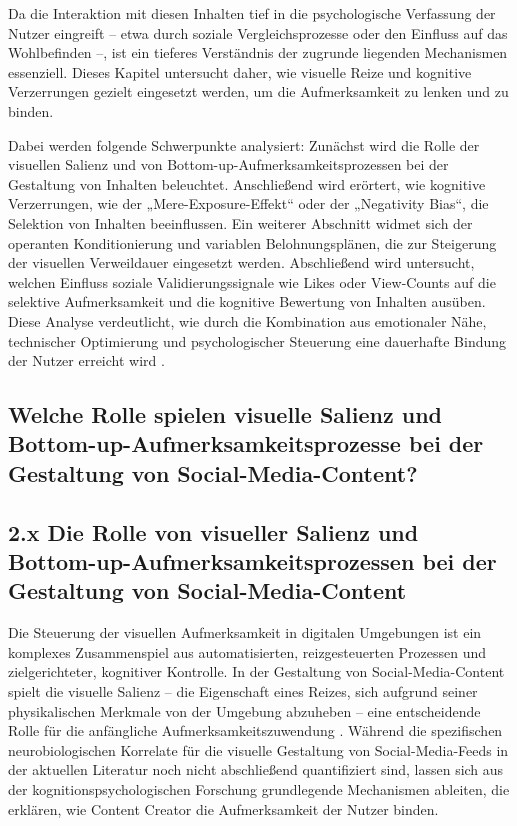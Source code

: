 \documentclass[11pt,a4paper]{article}
\begin{document}
Da die Interaktion mit diesen Inhalten tief in die psychologische Verfassung der Nutzer eingreift – etwa durch soziale Vergleichsprozesse oder den Einfluss auf das Wohlbefinden \autocite{openalex_W2924664363,doaj_10febcbb5e60420699a1d4570a075832} –, ist ein tieferes Verständnis der zugrunde liegenden Mechanismen essenziell. Dieses Kapitel untersucht daher, wie visuelle Reize und kognitive Verzerrungen gezielt eingesetzt werden, um die Aufmerksamkeit zu lenken und zu binden.

Dabei werden folgende Schwerpunkte analysiert: Zunächst wird die Rolle der visuellen Salienz und von Bottom-up-Aufmerksamkeitsprozessen bei der Gestaltung von Inhalten beleuchtet. Anschließend wird erörtert, wie kognitive Verzerrungen, wie der „Mere-Exposure-Effekt“ oder der „Negativity Bias“, die Selektion von Inhalten beeinflussen. Ein weiterer Abschnitt widmet sich der operanten Konditionierung und variablen Belohnungsplänen, die zur Steigerung der visuellen Verweildauer eingesetzt werden. Abschließend wird untersucht, welchen Einfluss soziale Validierungssignale wie Likes oder View-Counts auf die selektive Aufmerksamkeit und die kognitive Bewertung von Inhalten ausüben. Diese Analyse verdeutlicht, wie durch die Kombination aus emotionaler Nähe, technischer Optimierung und psychologischer Steuerung eine dauerhafte Bindung der Nutzer erreicht wird \autocite{crossref_10_22215_etd_2019_13484,arxiv_2406_13820,grey_grey_5d5c282590c448fc8776b04f78a08de5}.

\subsection{Welche Rolle spielen visuelle Salienz und Bottom-up-Aufmerksamkeitsprozesse bei der Gestaltung von Social-Media-Content?}

\subsection{2.x Die Rolle von visueller Salienz und Bottom-up-Aufmerksamkeitsprozessen bei der Gestaltung von Social-Media-Content}

Die Steuerung der visuellen Aufmerksamkeit in digitalen Umgebungen ist ein komplexes Zusammenspiel aus automatisierten, reizgesteuerten Prozessen und zielgerichteter, kognitiver Kontrolle. In der Gestaltung von Social-Media-Content spielt die visuelle Salienz – die Eigenschaft eines Reizes, sich aufgrund seiner physikalischen Merkmale von der Umgebung abzuheben – eine entscheidende Rolle für die anfängliche Aufmerksamkeitszuwendung \autocite{europepmc_42137086}. Während die spezifischen neurobiologischen Korrelate für die visuelle Gestaltung von Social-Media-Feeds in der aktuellen Literatur noch nicht abschließend quantifiziert sind, lassen sich aus der kognitionspsychologischen Forschung grundlegende Mechanismen ableiten, die erklären, wie Content Creator die Aufmerksamkeit der Nutzer binden.
\end{document}
